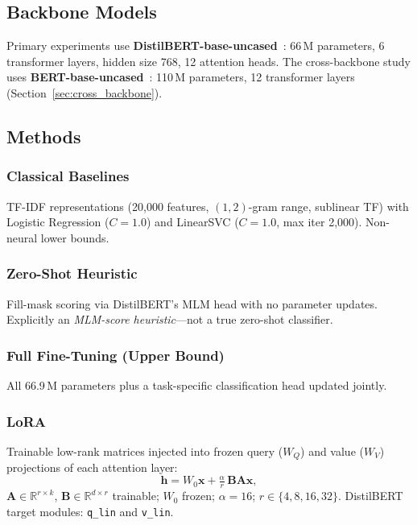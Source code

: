 \documentclass[conference]{IEEEtran}
\begin{document}
\subsection{Backbone Models}

Primary experiments use \textbf{DistilBERT-base-uncased}~\cite{sanh2019distilbert}: 66\,M parameters, 6 transformer layers, hidden size 768, 12 attention heads. The cross-backbone study uses \textbf{BERT-base-uncased}~\cite{devlin2019bert}: 110\,M parameters, 12 transformer layers (Section~\ref{sec:cross_backbone}).

\subsection{Methods}

\subsubsection{Classical Baselines}
TF-IDF representations (20{,}000 features, $(1,2)$-gram range, sublinear TF) with Logistic Regression ($C{=}1.0$) and LinearSVC ($C{=}1.0$, max iter 2{,}000). Non-neural lower bounds.

\subsubsection{Zero-Shot Heuristic}
Fill-mask scoring via DistilBERT's MLM head with no parameter updates. Explicitly an \emph{MLM-score heuristic}---not a true zero-shot classifier.

\subsubsection{Full Fine-Tuning (Upper Bound)}
All 66.9\,M parameters plus a task-specific classification head updated jointly.

\subsubsection{LoRA~\cite{hu2022lora}}
Trainable low-rank matrices injected into frozen query ($W_Q$) and value ($W_V$) projections of each attention layer:
\begin{equation}
  \mathbf{h} = W_0\mathbf{x} + \tfrac{\alpha}{r}\,\mathbf{B}\mathbf{A}\mathbf{x},
  \label{eq:lora}
\end{equation}
$\mathbf{A}{\in}\mathbb{R}^{r\times k}$, $\mathbf{B}{\in}\mathbb{R}^{d\times r}$ trainable; $W_0$ frozen; $\alpha{=}16$; $r{\in}\{4,8,16,32\}$. DistilBERT target modules: \texttt{q\_lin} and \texttt{v\_lin}.
\end{document}
